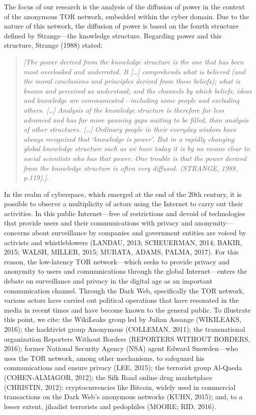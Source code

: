 The focus of our research is the analysis of the diffusion of power in the context of the anonymous TOR network, embedded within the cyber domain. Due to the nature of this network, the diffusion of power is based on the fourth structure defined by Strange—the knowledge structure. Regarding power and this structure, Strange (1988) stated:

\begin{quote}
\small
\textit{[The power derived from the knowledge structure is the one that has been most overlooked and underrated. It […] comprehends what is believed (and the moral conclusions and principles derived from those beliefs); what is known and perceived as understood; and the channels by which beliefs, ideas and knowledge are communicated—including some people and excluding others. […] Analysis of the knowledge structure is therefore far less advanced and has far more yawning gaps waiting to be filled, than analysis of other structures. […] Ordinary people in their everyday wisdom have always recognized that ‘knowledge is power'. But in a rapidly changing global knowledge structure such as we have today it is by no means clear to social scientists who has that power. One trouble is that the power derived from the knowledge structure is often very diffused. (STRANGE, 1988, p.119).]}.
\end{quote}

In the realm of cyberspace, which emerged at the end of the 20th century, it is possible to observe a multiplicity of actors using the Internet to carry out their activities. In this public Internet—free of restrictions and devoid of technologies that provide users and their communications with privacy and anonymity—concerns about surveillance by companies and government entities are voiced by activists and whistleblowers (LANDAU, 2013; SCHEUERMAN, 2014; BAKIR, 2015; WALSH, MILLER, 2015; MURATA, ADAMS, PALMA, 2017). For this reason, the low-latency TOR network—which seeks to provide privacy and anonymity to users and communications through the global Internet—enters the debate on surveillance and privacy in the digital age as an important communication channel. Through the Dark Web, specifically the TOR network, various actors have carried out political operations that have resonated in the media in recent times and have become known to the general public. To illustrate this point, we cite: the WikiLeaks group led by Julian Assange (WIKILEAKS, 2016); the hacktivist group Anonymous (COLLEMAN, 2011); the transnational organization Reporters Without Borders (REPORTERS WITHOUT BORDERS, 2016); former National Security Agency (NSA) agent Edward Snowden—who uses the TOR network, among other mechanisms, to safeguard his communications and ensure privacy (LEE, 2015); the terrorist group Al-Qaeda (COHEN-ALMAGOR, 2012); the Silk Road online drug marketplace (CHRISTIN, 2012); cryptocurrencies like Bitcoin, widely used in commercial transactions on the Dark Web's anonymous networks (KUHN, 2015); and, to a lesser extent, jihadist terrorists and pedophiles (MOORE; RID, 2016).

